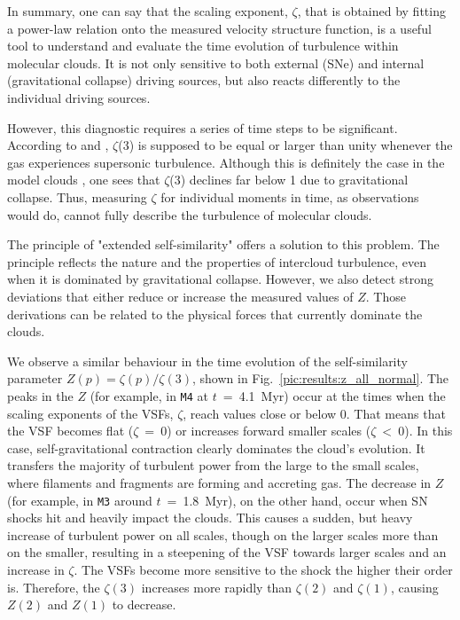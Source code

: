 In summary, one can say that the scaling exponent, $\zeta$, that is obtained by fitting a power-law relation onto the measured velocity structure function, is a useful tool to understand and evaluate the time evolution of turbulence within molecular clouds. 
It is not only sensitive to both external (SNe) and internal (gravitational collapse) driving sources, but also reacts differently to the individual driving sources. 

However, this diagnostic requires a series of time steps to be significant.
According to \citet{She1994} and \citet{Boldyrev2002}, $\zeta$(3) is supposed to be equal or larger than unity whenever the gas experiences supersonic turbulence.
Although this is definitely the case in the model clouds , one sees that $\zeta$(3) declines far below 1 due to gravitational collapse.
Thus, measuring $\zeta$ for individual moments in time, as observations would do, cannot fully describe the turbulence of molecular clouds.

The principle of "extended self-similarity" \citep[Sect.~\ref{methods:vsf}]{Benzi1993} offers a solution to this problem.
The principle reflects the nature and the properties of intercloud turbulence, even when it is dominated by gravitational collapse.
However, we also detect strong deviations that either reduce or increase the measured values of $Z$.
Those derivations can be related to the physical forces that currently dominate the clouds.

We observe a similar behaviour in the time evolution of the self-similarity parameter $Z(p) = \zeta(p) / \zeta(3)$, shown in Fig.~\ref{pic:results:z_all_normal}.
The peaks in the $Z$ (for example, in \texttt{M4} at $t$~=~4.1~Myr) occur at the times when the scaling exponents of the VSFs, $\zeta$, reach values close or below 0.
That means that the VSF becomes flat ($\zeta$~=~0) or increases forward smaller scales ($\zeta~<~0$). 
In this case, self-gravitational contraction clearly dominates the cloud's evolution.
It transfers the majority of turbulent power from the large to the small scales, where filaments and fragments are forming and accreting gas.
The decrease in $Z$ (for example, in \texttt{M3} around $t$~=~1.8~Myr), on the other hand, occur when SN shocks hit and heavily impact the clouds. 
This causes a sudden, but heavy increase of turbulent power on all scales, though on the larger scales more than on the smaller, resulting in a steepening of the VSF towards larger scales and an increase in $\zeta$.
The VSFs become more sensitive to the shock the higher their order is.
Therefore, the $\zeta(3)$ increases more rapidly than $\zeta(2)$ and $\zeta(1)$, causing $Z(2)$ and $Z(1)$ to decrease.

